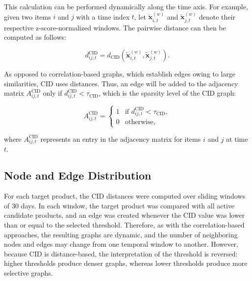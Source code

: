 This calculation can be performed dynamically along the time axis. For example, given two items $i$ and $j$ with a time index $t$, let $\tilde{\mathbf{x}}_{i,t}^{(w)}$ and $\tilde{\mathbf{x}}_{j,t}^{(w)}$ denote their respective z-score-normalized windows. The pairwise distance can then be computed as follows:

\begin{equation}
d^{\text{CID}}_{ij,t} = d_{\text{CID}}(\tilde{\mathbf{x}}_{i,t}^{(w)}, \tilde{\mathbf{x}}_{j,t}^{(w)}). \label{eq:cid_pairwise_dynamic}
\end{equation}

As opposed to correlation-based graphs, which establish edges owing to large similarities, CID uses distances. Thus, an edge will be added to the adjacency matrix $A^{\text{CID}}_{ij,t}$ only if $d^{\text{CID}}_{ij,t} < \tau_{\text{CID}}$, which is the sparsity level of the CID graph:

\begin{equation}
A^{\text{CID}}_{ij,t} =
\begin{cases}
1 & \text{if } d^{\text{CID}}_{ij,t} < \tau_{\text{CID}}, \\
0 & \text{otherwise},
\end{cases} \label{eq:cid_adjacency}
\end{equation}

where $A^{\text{CID}}_{ij,t}$ represents an entry in the adjacency matrix for items $i$ and $j$ at time $t$.


\subsection{Node and Edge Distribution}
\label{subsubsec:cid_node_edge_distribution}

For each target product, the CID distances were computed over sliding windows of 30 days. In each window, the target product was compared with all active candidate products, and an edge was created whenever the CID value was lower than or equal to the selected threshold. Therefore, as with the correlation-based approaches, the resulting graphs are dynamic, and the number of neighboring nodes and edges may change from one temporal window to another. However, because CID is distance-based, the interpretation of the threshold is reversed: higher thresholds produce denser graphs, whereas lower thresholds produce more selective graphs.


